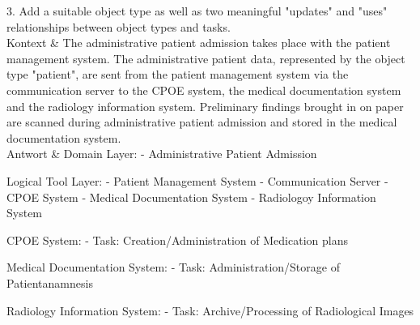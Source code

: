 3. Add a suitable object type as well as two meaningful "updates" and "uses" relationships between object types and tasks. \\
Kontext & The administrative patient admission takes place with the patient management system. The administrative patient data, represented by the object type "patient", are sent from the patient management system via the communication server to the CPOE system, the medical documentation system and the radiology information system. Preliminary findings brought in on paper are scanned during administrative patient admission and stored in the medical documentation system. \\
Antwort & Domain Layer:
- Administrative Patient Admission

Logical Tool Layer:
- Patient Management System
- Communication Server
- CPOE System
- Medical Documentation System
- Radiologoy Information System


CPOE System:
- Task: Creation/Administration of Medication plans

Medical Documentation System:
- Task: Administration/Storage of Patientanamnesis

Radiology Information System:
- Task: Archive/Processing of Radiological Images

